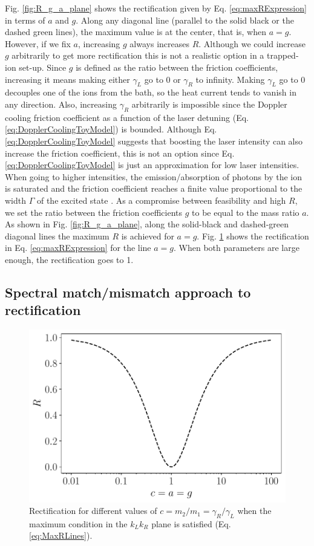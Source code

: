Fig. \ref{fig:R_g_a_plane} shows the rectification given by Eq. \eqref{eq:maxRExpression} in terms of $a$ and $g$. Along any diagonal line (parallel to the solid black or the dashed green lines), the maximum value is at the center, that is, when $a = g$. However, if we fix $a$, increasing $g$ always increases $R$. Although we could increase $g$ arbitrarily to get more rectification this is not a realistic option in a trapped-ion set-up. Since $g$ is defined as the ratio between the friction coefficients, increasing it means making either $\gamma_L$ go to 0 or $\gamma_R$ to infinity. Making $\gamma_L$ go to 0 decouples one of the ions from the bath, so the heat current tends to vanish in any direction. Also, increasing $\gamma_R$ arbitrarily is impossible since the Doppler cooling friction coefficient as a function of the laser detuning (Eq. \eqref{eq:DopplerCoolingToyModel}) is bounded. Although Eq. \eqref{eq:DopplerCoolingToyModel} suggests that boosting the laser intensity can also increase the friction coefficient, this is not an option since Eq. \eqref{eq:DopplerCoolingToyModel} is just an approximation for low laser intensities. When going to higher intensities, the emission/absorption of photons by the ion is saturated and the friction coefficient reaches a finite value proportional to the width $\Gamma$ of the excited state \cite{Metcalf2003}. As a compromise between feasibility and high $R$, we set the ratio between the friction coefficients $g$ to be equal to the mass ratio $a$. As shown  in Fig. \ref{fig:R_g_a_plane}, along the solid-black and dashed-green diagonal lines the maximum $R$ is achieved for $a = g$. Fig. \ref{fig:Fig_PerfectRectification} shows the rectification in Eq. \eqref{eq:maxRExpression} for the line $a = g$. When both parameters are large enough, the rectification goes to 1.
%
%
\subsection{Spectral match/mismatch approach to rectification}
%
%
%
\begin{figure}
  \centering
  \includegraphics[width=\linewidth]{Figures/CC.pdf}
  \caption{Rectification for different values of $c=m_2/m_1=\gamma_R/\gamma_L$ when the maximum condition in the $k_L k_R$ plane is satisfied (Eq. \eqref{eq:MaxRLines}).}
  \label{fig:Fig_PerfectRectification}
\end{figure}

